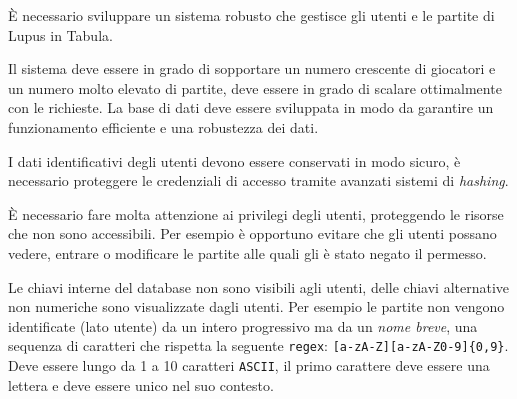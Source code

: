 È necessario sviluppare un sistema robusto che gestisce gli utenti e le partite di Lupus in Tabula.

Il sistema deve essere in grado di sopportare un numero crescente di giocatori e un numero molto elevato di partite, deve essere in grado di scalare ottimalmente con le richieste. La base di dati deve essere sviluppata in modo da garantire un funzionamento efficiente e una robustezza dei dati.

I dati identificativi degli utenti devono essere conservati in modo sicuro, è necessario proteggere le credenziali di accesso tramite avanzati sistemi di \emph{hashing}.

È necessario fare molta attenzione ai privilegi degli utenti, proteggendo le risorse che non sono accessibili. Per esempio è opportuno evitare che gli utenti possano vedere, entrare o modificare le partite alle quali gli è stato negato il permesso.

Le chiavi interne del database non sono visibili agli utenti, delle chiavi alternative non numeriche sono visualizzate dagli utenti. Per esempio le partite non vengono identificate (lato utente) da un intero progressivo ma da un \emph{nome breve}, una sequenza di caratteri che rispetta la seguente \texttt{regex}: \texttt{[a-zA-Z][a-zA-Z0-9]\{0,9\}}. Deve essere lungo da 1 a 10 caratteri \texttt{ASCII}, il primo carattere deve essere una lettera e deve essere unico nel suo contesto.